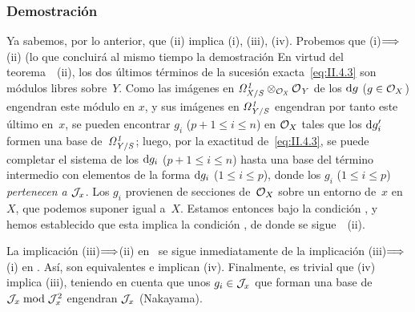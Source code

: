 \subsubsection*{Demostración}
Ya
sabemos, por lo anterior, que (ii) implica (i), (iii), (iv). Probemos que (i)$\To$(ii) (lo que concluirá al mismo tiempo la demostración
En virtud del teorema~~(ii), los dos últimos términos de la sucesión exacta~\eqref{eq:II.4.3} son módulos libres sobre~$Y$. Como las imágenes en $\it{\Omega}^1_{X/S}\otimes_{\cal{O}_X}\cal{O}_Y$ de los $\rd g$ ($g\in\cal{O}_X$) engendran este módulo en $x$, y sus imágenes en $\it{\Omega}^1_{Y/S}$ engendran por tanto este último en~$x$, se pueden encontrar $g_i$ ($p+1\leq i\leq n$) en $\cal{O}_X$ tales que los $\rd g'_i$ formen una base de~$\it{\Omega}^1_{Y/S}$; luego, por la exactitud de~\eqref{eq:II.4.3}, se puede completar el sistema de los $\rd g_i$ ($p+1\leq i\leq n$) hasta una base del término intermedio con elementos de la forma $\rd g_i$ ($1\leq i\leq p$), donde los $g_i$ ($1\leq i\leq p$) \emph{pertenecen a $\cal{J}_x$}. Los $g_i$ provienen de secciones de~$\cal{O}_X$ sobre un entorno de~$x$ en $X$, que podemos suponer igual a~$X$. Estamos entonces bajo la condición
,
y hemos establecido que esta implica la condición
,
de donde se sigue~~(ii).

La implicación (iii)$\To$(ii) en~ se sigue inmediatamente de la implicación (iii)$\To$(i) en
.
Así,
son equivalentes e implican (iv). Finalmente, es trivial que (iv) implica (iii), teniendo en cuenta que unos $g_i\in\cal{J}_x$ que forman una base de~$\cal{J}_x\bmod\cal{J}_x^2$ engendran $\cal{J}_x$ (Nakayama).

